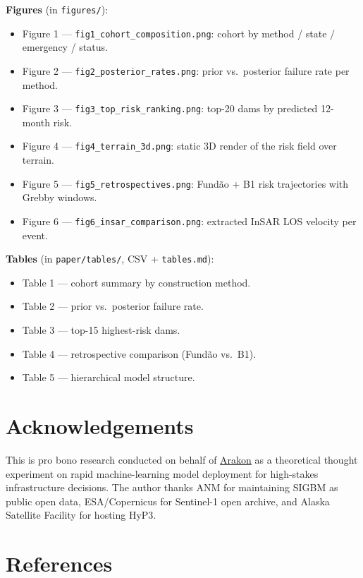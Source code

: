 \documentclass[
  11pt]{article}
\providecommand{\tightlist}{%
  \setlength{\itemsep}{0pt}\setlength{\parskip}{0pt}}
\begin{document}
\textbf{Figures} (in \texttt{figures/}):

\begin{itemize}
\tightlist
\item
  Figure 1 --- \texttt{fig1\_cohort\_composition.png}: cohort by method
  / state / emergency / status.
\item
  Figure 2 --- \texttt{fig2\_posterior\_rates.png}: prior vs.~posterior
  failure rate per method.
\item
  Figure 3 --- \texttt{fig3\_top\_risk\_ranking.png}: top-20 dams by
  predicted 12-month risk.
\item
  Figure 4 --- \texttt{fig4\_terrain\_3d.png}: static 3D render of the
  risk field over terrain.
\item
  Figure 5 --- \texttt{fig5\_retrospectives.png}: Fundão + B1 risk
  trajectories with Grebby windows.
\item
  Figure 6 --- \texttt{fig6\_insar\_comparison.png}: extracted InSAR LOS
  velocity per event.
\end{itemize}

\textbf{Tables} (in \texttt{paper/tables/}, CSV + \texttt{tables.md}):

\begin{itemize}
\tightlist
\item
  Table 1 --- cohort summary by construction method.
\item
  Table 2 --- prior vs.~posterior failure rate.
\item
  Table 3 --- top-15 highest-risk dams.
\item
  Table 4 --- retrospective comparison (Fundão vs.~B1).
\item
  Table 5 --- hierarchical model structure.
\end{itemize}

\section{Acknowledgements}\label{acknowledgements}

This is pro bono research conducted on behalf of
\href{https://arakon.co.uk}{Arakon} as a theoretical thought experiment
on rapid machine-learning model deployment for high-stakes
infrastructure decisions. The author thanks ANM for maintaining SIGBM as
public open data, ESA/Copernicus for Sentinel-1 open archive, and Alaska
Satellite Facility for hosting HyP3.

\section{References}\label{references}
\end{document}

